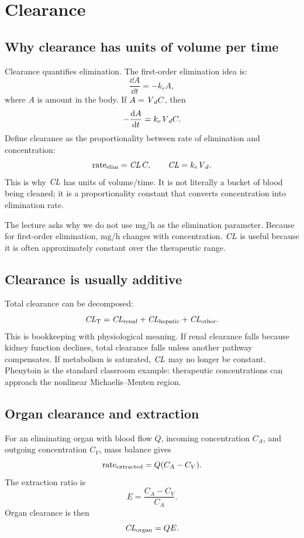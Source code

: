 \documentclass[a4paper]{article}
\newcommand{\CL}{\ensuremath{\pksym{CL}}}
\newcommand{\Vd}{\ensuremath{\pksym{V}_d}}
\newcommand{\ke}{\ensuremath{k_e}}
\begin{document}
\section{Clearance}

\subsection{Why clearance has units of volume per time}

Clearance quantifies elimination. The first-order elimination idea is:
\[
  \frac{\dd A}{\dd t}=-\ke{} A,
\]
where \(A\) is amount in the body. If \(A=\Vd{} C\), then
\[
  -\frac{\dd A}{\dd t}=\ke{} \Vd{} C.
\]
Define clearance as the proportionality between rate of elimination and concentration:
\[
  \text{rate}_{\pklab{elim}} = \CL\,C,
  \qquad
  \CL=\ke{} \Vd.
\]
This is why \CL{} has units of volume/time. It is not literally a bucket of blood being cleaned; it is a proportionality constant that converts concentration into elimination rate.

\begin{remark}
  The lecture asks why we do not use mg/h as the elimination parameter. Because for first-order elimination, mg/h changes with concentration. \CL{} is useful because it is often approximately constant over the therapeutic range.
\end{remark}

\subsection{Clearance is usually additive}

Total clearance can be decomposed:
\[
  \CL_{\pklab{T}}
  =
  \CL_{\pklab{renal}}
  +
  \CL_{\pklab{hepatic}}
  +
  \CL_{\pklab{other}}.
\]
This is bookkeeping with physiological meaning. If renal clearance falls because kidney function declines, total clearance falls unless another pathway compensates. If metabolism is saturated, \CL{} may no longer be constant. Phenytoin is the standard classroom example: therapeutic concentrations can approach the nonlinear Michaelis--Menten region.

\subsection{Organ clearance and extraction}

For an eliminating organ with blood flow \(Q\), incoming concentration \(C_A\), and outgoing concentration \(C_V\), mass balance gives
\[
  \text{rate}_{\mathrm{extracted}} = Q(C_A-C_V).
\]
The extraction ratio is
\[
  E=\frac{C_A-C_V}{C_A}.
\]
Organ clearance is then
\[
  \CL_{\pklab{organ}}=Q E.
\]
\end{document}
